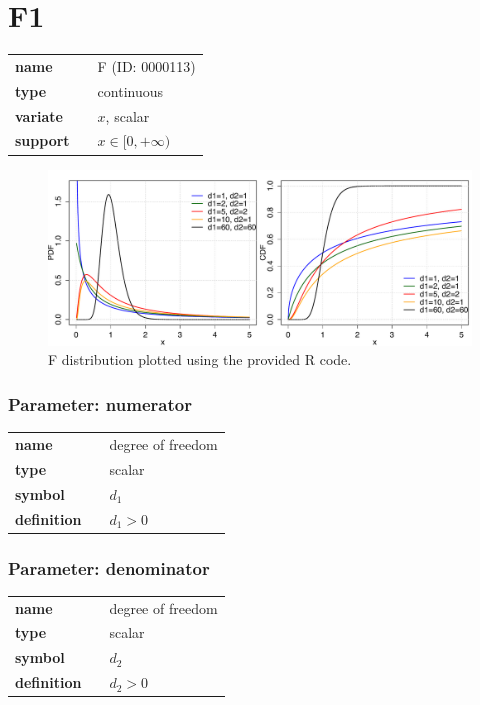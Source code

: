 \section*{F1} 

  \bigskip 

\begin{tabular}{p{2cm}cl}
\textbf{name} & & F (ID: 0000113)\\ 
 
\textbf{type} & & continuous \\ 

\textbf{variate} & & $x$, scalar \\ 

\textbf{support} & & $x \in [0,+\infty)$
\end{tabular}

\begin{figure}[ht!]
\centering
  \includegraphics[width=140mm]{pics/F.pdf}
 \caption{F distribution plotted using the provided R code.}
 \label{fig:F}
\end{figure}

\subsubsection*{Parameter: numerator}

\noindent\begin{tabular}{p{2cm}cl}
\textbf{name} & & degree of freedom \\
\textbf{type} & & scalar \\
\textbf{symbol} & & $d_1$  \\
\textbf{definition} & & $d_1 > 0$
\end{tabular}
\subsubsection*{Parameter: denominator}

\noindent\begin{tabular}{p{2cm}cl}
\textbf{name} & & degree of freedom \\
\textbf{type} & & scalar \\
\textbf{symbol} & & $d_2$  \\
\textbf{definition} & & $d_2 > 0$
\end{tabular}
